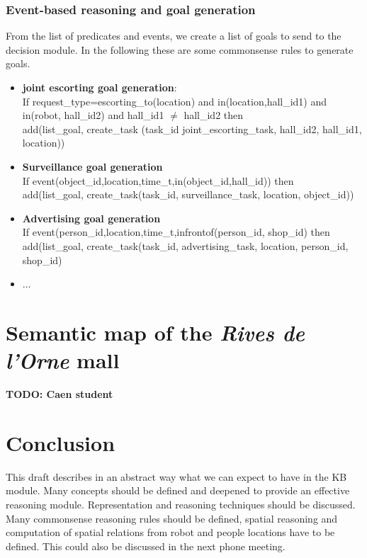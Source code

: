 \documentclass{article}
\begin{document}
   \subsubsection{Event-based reasoning and goal generation}
   From the list of predicates and events, we create a list of goals to send to the decision module. In the following these are some commonsense rules to generate goals. 
   \begin{itemize}
\item  {\bf joint escorting goal generation}: \\
  If request\_type=escorting\_to(location) and in(location,hall\_id1) and in(robot, hall\_id2) and hall\_id1 $\neq$ hall\_id2 then \\
  add(list\_goal, create\_task (task\_id joint\_escorting\_task, hall\_id2, hall\_id1, location))
\item  {\bf Surveillance goal generation} \\
  If event(object\_id,location,time\_t,in(object\_id,hall\_id)) then \\
  add(list\_goal, create\_task(task\_id, surveillance\_task, location, object\_id))
\item {\bf Advertising goal generation} \\
   If event(person\_id,location,time\_t,infrontof(person\_id, shop\_id) then \\
   add(list\_goal, create\_task(task\_id, advertising\_task, location, person\_id, shop\_id)
\item $\dots$
   \end{itemize}
  

\section{Semantic map of the \emph{Rives de l'Orne} mall}
 
{\bf TODO: Caen student}

\vspace{3cm}


\section{Conclusion}
  
This draft describes in an abstract way what we can expect to have in the KB module. Many concepts should be defined and deepened to provide an effective reasoning module. Representation and reasoning techniques should be discussed. Many commonsense reasoning rules should be defined, spatial reasoning and computation of spatial relations from robot and people locations have to be defined. This could also be discussed in the next phone meeting.
     
\end{document}
